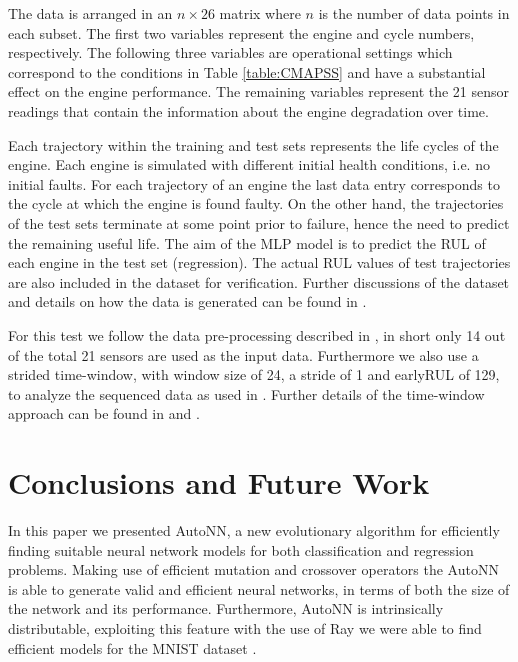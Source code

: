 \documentclass[journal]{IEEEtran}
\begin{document}
The data is arranged in an $n\times26$ matrix where $n$ is the number of data points in each subset. The first two variables represent the engine and cycle
numbers, respectively. The following three variables are operational settings which correspond to the conditions in Table \ref{table:CMAPSS} and have a
substantial effect on the engine performance. The remaining variables represent the 21 sensor readings that contain the information about the engine
degradation over time.

Each trajectory within the training and test sets represents the life cycles of the engine. Each engine is simulated with different initial health conditions, i.e. no initial faults. For each trajectory of an engine the last data entry corresponds to the cycle at which the engine is found faulty. On the other hand, the trajectories of the test sets terminate at some point prior to failure, hence the need to predict the remaining useful life. The aim of the MLP model is to predict the RUL of each engine in the test set (regression). The actual RUL values of test trajectories are also included in the dataset for verification. Further discussions of the dataset and details on how the data is generated can be found in \cite{Saxena2008}.

For this test we follow the data pre-processing described in \cite{Laredo2018}, in short only 14 out of the total 21 sensors are used as the input data. Furthermore we also use a strided time-window, with window size of 24, a stride of 1 and earlyRUL of 129, to analyze the sequenced data as used in \cite{Laredo2018}. Further details of the time-window approach can be found in \cite{Laredo2018} and \cite{Li2018}.


\section{Conclusions and Future Work}
\label{sec:conclusions}

In this paper we presented AutoNN, a new evolutionary algorithm for efficiently finding suitable neural network models for both classification and regression problems. Making use of efficient mutation and crossover operators the AutoNN is able to generate valid and efficient neural networks, in terms of both the size of the network and its performance. Furthermore, AutoNN is intrinsically distributable, exploiting this feature with the use of Ray \cite{Moritz2017} we were able to find efficient models for the MNIST dataset \cite{Lecun2010}.
\end{document}
